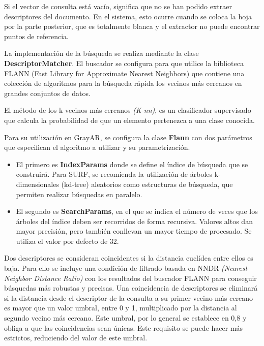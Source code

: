 Si el vector de consulta está vacío, significa que no se han podido
extraer descriptores del documento. En el sistema, esto ocurre
cuando se coloca la hoja por la parte posterior, que es totalmente
blanca y el extractor no puede encontrar puntos de referencia.

La implementación de la búsqueda se realiza mediante la clase
\textbf{DescriptorMatcher}. El buscador se configura para que utilice
la biblioteca FLANN (Fast Library for Approximate Nearest Neighbors)
que contiene una colección de algoritmos para la búsqueda rápida los
vecinos más cercanos en grandes conjuntos de datos.

El método de los k vecinos más cercanos \emph{(K-nn)}, es un clasificador
supervisado que calcula la probabilidad de que un elemento pertenezca
a una clase conocida.

Para su utilización en GrayAR, se configura la clase \textbf{Flann}
con dos parámetros que especifican el algoritmo a utilizar y su parametrización.

\begin{itemize}
\item El primero es \textbf{IndexParams} donde se define el índice de búsqueda
que se construirá. Para SURF, se recomienda la utilización de árboles
k-dimensionales (kd-tree) aleatorios como estructuras de búsqueda, que
permiten realizar búsquedas en paralelo.

\item El segundo es \textbf{SearchParams}, en el que se indica el número de
veces que los árboles del índice deben ser recorridos de forma
recursiva. Valores altos dan mayor precisión, pero también conllevan
un mayor tiempo de procesado. Se utiliza el valor por defecto de 32.
\end{itemize}

Dos descriptores se consideran coincidentes si la distancia euclídea
entre ellos es baja. Para ello se incluye una condición de filtrado
basada en NNDR \emph{(Nearest Neighbor Distance Ratio)} con los resultados
del buscador FLANN para conseguir búsquedas más robustas y
precisas. Una coincidencia de descriptores se eliminará si la
distancia desde el descriptor de la consulta a su primer vecino más
cercano es mayor que un valor umbral, entre 0 y 1, multiplicado por la
distancia al segundo vecino más cercano. Este umbral, por lo general
se establece en 0,8 y obliga a que las coincidencias sean únicas. Este
requisito se puede hacer más estrictos, reduciendo del valor de este
umbral.

